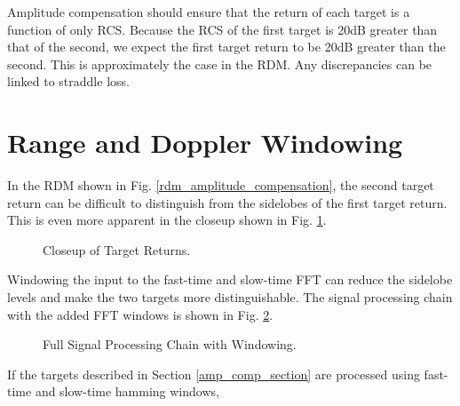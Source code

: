 \documentclass[conference]{IEEEtran}
\begin{document}
\noindent
Amplitude compensation should ensure that the return of each target is a function of only RCS. Because the RCS of the first target is 20dB greater than that of the second, we expect the first target return to be 20dB greater than the second. This is approximately the case in the RDM. Any discrepancies can be linked to straddle loss.
\section{Range and Doppler Windowing}
In the RDM shown in Fig. \ref{rdm_amplitude_compensation}, the second target return can be difficult to distinguish from the sidelobes of the first target return. This is even more apparent in the closeup shown in Fig. \ref{rdm_amplitude_compensation_close}.
\begin{figure}[H]
\centerline{}
\caption{Closeup of Target Returns.}
\label{rdm_amplitude_compensation_close}
\end{figure}
\noindent
Windowing the input to the fast-time and slow-time FFT can reduce the sidelobe levels and make the two targets more distinguishable. The signal processing chain with the added FFT windows is shown in Fig. \ref{fft_windowing_bd}.
\begin{figure}[H]
\centerline{}
\caption{Full Signal Processing Chain with Windowing.}
\label{fft_windowing_bd}
\end{figure}
If the targets described in Section \ref{amp_comp_section} are processed using fast-time and slow-time hamming windows,
\end{document}
